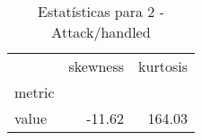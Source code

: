 \begin{table}[htbp]
\caption{Estatísticas para 2 - Attack/handled}
\label{tab:2_-_attack_handled_skewkurt}
\begin{tabular}{lrr}
\toprule
 & skewness & kurtosis \\
metric &  &  \\
\midrule
value & -11.62 & 164.03 \\
\bottomrule
\end{tabular}
\end{table}
